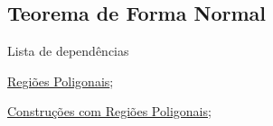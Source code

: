 \subsection{Teorema de Forma Normal}
\label{forma-normal-thm}
\begin{titlemize}{Lista de dependências}
	\item \hyperref[regiao-poligonal-def]{Regiões Poligonais};\\
	\item \hyperref[construcoes-regiao-poligonal-prop]{Construções com Regiões Poligonais};\\
\end{titlemize}

